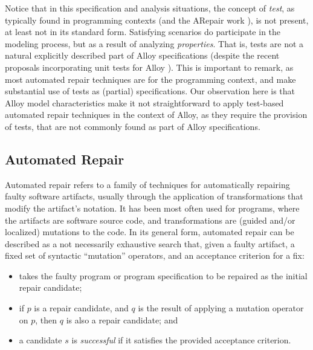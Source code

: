Notice that in this specification and analysis situations, the concept of \emph{test}, as typically found in programming contexts (and the ARepair work \cite{Sullivan+2018}), is not present, at least not in its standard form. Satisfying scenarios do participate in the modeling process, but as a result of analyzing \emph{properties}. That is, tests are not a natural explicitly described part of Alloy specifications (despite the recent proposals incorporating unit tests for Alloy \cite{Sullivan+2018}). This is important to remark, as most automated repair techniques are for the programming context, and make substantial use of tests as (partial) specifications. Our observation here is that Alloy model characteristics make it not straightforward to apply test-based automated repair techniques in the context of Alloy, as they require the provision of tests, that are not commonly found as part of Alloy specifications.   

\subsection{Automated Repair}

Automated repair refers to a family of techniques for automatically repairing faulty software artifacts, usually through the application of transformations that modify the artifact's notation. It has been most often used for programs, where the artifacts are software source code, and transformations are (guided and/or localized) mutations to the code. In its general form, automated repair can be described as a not necessarily exhaustive search that, given a faulty artifact, a fixed set of syntactic ``mutation'' operators, and an acceptance criterion for a fix:
\begin{itemize}

\item takes the faulty program or program specification to be repaired as the initial repair candidate;

\item if $p$ is a repair candidate, and $q$ is the result of applying a mutation operator on $p$, then $q$ is also a repair candidate; and

\item a candidate $s$ is \emph{successful} if it satisfies the provided acceptance criterion.

\end{itemize}

